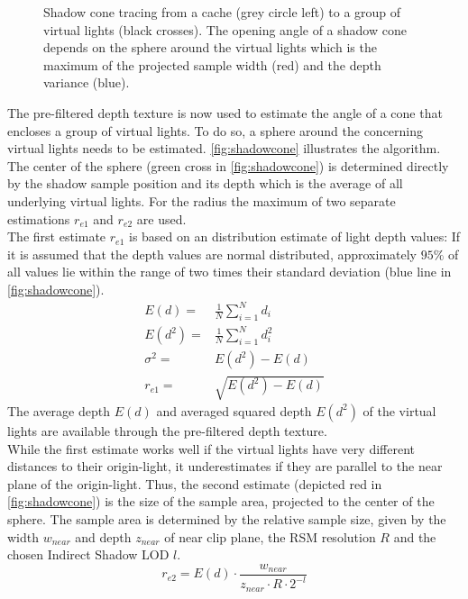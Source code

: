 \documentclass[thesis.tex]{subfiles}
\begin{document}
\begin{figure}[h]
	\centering
	\caption{Shadow cone tracing from a cache (grey circle left) to a group of virtual lights (black crosses). The opening angle of a shadow cone depends on the sphere around the virtual lights which is the maximum of the projected sample width (red) and the depth variance (blue).} \label{fig:shadowcone}
\end{figure}
The pre-filtered depth texture is now used to estimate the angle of a cone that encloses a group of virtual lights.
To do so, a sphere around the concerning virtual lights needs to be estimated.
\autoref{fig:shadowcone} illustrates the algorithm.
The center of the sphere (green cross in \autoref{fig:shadowcone}) is determined directly by the shadow sample position and its depth which is the average of all underlying virtual lights.
For the radius the maximum of two separate estimations $r_{e1}$ and $r_{e2}$ are used.
\\
The first estimate $r_{e1}$ is based on an distribution estimate of light depth values:
If it is assumed that the depth values are normal distributed, approximately $95\%$ of all values lie within the range of two times their standard deviation (blue line in \autoref{fig:shadowcone}).
\begin{align}
E(d) =& \frac{1}{N} \sum\limits_{i=1}^{N} d_i\\
E(d^2) =& \frac{1}{N} \sum\limits_{i=1}^{N} d_i^2\\
\sigma^2 =& E(d^2) - E(d)\\
r_{e1} =& \sqrt{E(d^2) - E(d)}
\end{align}
The average depth $E(d)$ and averaged squared depth $E(d^2)$ of the virtual lights are available through the pre-filtered depth texture.
\\
While the first estimate works well if the virtual lights have very different distances to their origin-light, it underestimates if they are parallel to the near plane of the origin-light.
Thus, the second estimate (depicted red in \autoref{fig:shadowcone}) is the size of the sample area, projected to the center of the sphere.
The sample area is determined by the relative sample size, given by the width $w_{near}$ and depth $z_{near}$ of near clip plane, the RSM resolution $R$ and the chosen Indirect Shadow LOD $l$.
\begin{equation}
r_{e2} = E(d) \cdot \frac{w_{near}}{z_{near} \cdot R \cdot 2^{-l} }
\end{equation}
\end{document}
